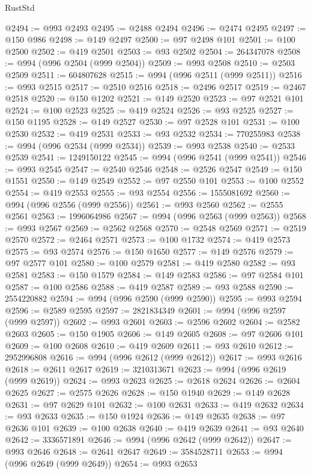\begin{lexlean}{RustStd}
\begin{coremodule}
@2494 := @993 @2493
@2495 := @2488 @2494
@2496 := @2474 @2495
@2497 := @150 @986
@2498 := @149 @2497
@2500 := @97 @2498 @101
@2501 := @100 @2500
@2502 := @419 @2501
@2503 := @93 @2502
@2504 := 264347078
@2508 := @994 (@996 @2504 (@999 @2504))
@2509 := @993 @2508
@2510 := @2503 @2509
@2511 := 604807628
@2515 := @994 (@996 @2511 (@999 @2511))
@2516 := @993 @2515
@2517 := @2510 @2516
@2518 := @2496 @2517
@2519 := @2467 @2518
@2520 := @150 @1202
@2521 := @149 @2520
@2523 := @97 @2521 @101
@2524 := @100 @2523
@2525 := @419 @2524
@2526 := @93 @2525
@2527 := @150 @1195
@2528 := @149 @2527
@2530 := @97 @2528 @101
@2531 := @100 @2530
@2532 := @419 @2531
@2533 := @93 @2532
@2534 := 770255983
@2538 := @994 (@996 @2534 (@999 @2534))
@2539 := @993 @2538
@2540 := @2533 @2539
@2541 := 1249150122
@2545 := @994 (@996 @2541 (@999 @2541))
@2546 := @993 @2545
@2547 := @2540 @2546
@2548 := @2526 @2547
@2549 := @150 @1551
@2550 := @149 @2549
@2552 := @97 @2550 @101
@2553 := @100 @2552
@2554 := @419 @2553
@2555 := @93 @2554
@2556 := 1555081692
@2560 := @994 (@996 @2556 (@999 @2556))
@2561 := @993 @2560
@2562 := @2555 @2561
@2563 := 1996064986
@2567 := @994 (@996 @2563 (@999 @2563))
@2568 := @993 @2567
@2569 := @2562 @2568
@2570 := @2548 @2569
@2571 := @2519 @2570
@2572 := @2464 @2571
@2573 := @100 @1732
@2574 := @419 @2573
@2575 := @93 @2574
@2576 := @150 @1650
@2577 := @149 @2576
@2579 := @97 @2577 @101
@2580 := @100 @2579
@2581 := @419 @2580
@2582 := @93 @2581
@2583 := @150 @1579
@2584 := @149 @2583
@2586 := @97 @2584 @101
@2587 := @100 @2586
@2588 := @419 @2587
@2589 := @93 @2588
@2590 := 2554220882
@2594 := @994 (@996 @2590 (@999 @2590))
@2595 := @993 @2594
@2596 := @2589 @2595
@2597 := 2821834349
@2601 := @994 (@996 @2597 (@999 @2597))
@2602 := @993 @2601
@2603 := @2596 @2602
@2604 := @2582 @2603
@2605 := @150 @1905
@2606 := @149 @2605
@2608 := @97 @2606 @101
@2609 := @100 @2608
@2610 := @419 @2609
@2611 := @93 @2610
@2612 := 2952996808
@2616 := @994 (@996 @2612 (@999 @2612))
@2617 := @993 @2616
@2618 := @2611 @2617
@2619 := 3210313671
@2623 := @994 (@996 @2619 (@999 @2619))
@2624 := @993 @2623
@2625 := @2618 @2624
@2626 := @2604 @2625
@2627 := @2575 @2626
@2628 := @150 @1940
@2629 := @149 @2628
@2631 := @97 @2629 @101
@2632 := @100 @2631
@2633 := @419 @2632
@2634 := @93 @2633
@2635 := @150 @1924
@2636 := @149 @2635
@2638 := @97 @2636 @101
@2639 := @100 @2638
@2640 := @419 @2639
@2641 := @93 @2640
@2642 := 3336571891
@2646 := @994 (@996 @2642 (@999 @2642))
@2647 := @993 @2646
@2648 := @2641 @2647
@2649 := 3584528711
@2653 := @994 (@996 @2649 (@999 @2649))
@2654 := @993 @2653

\end{coremodule}
\end{lexlean}

